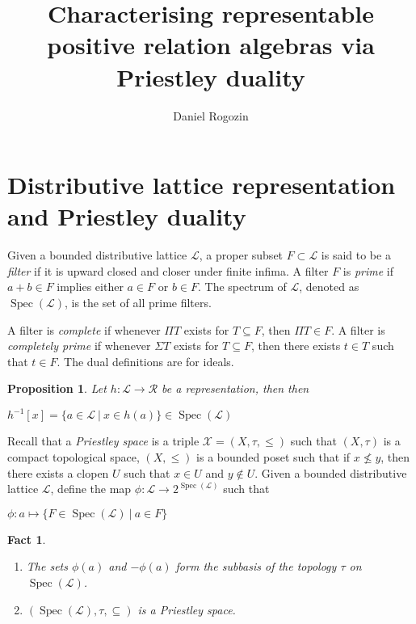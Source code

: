 \documentclass[a4paper]{article}
\author{Daniel Rogozin}
\date{}
\title{Characterising representable positive relation algebras via Priestley duality}
\theoremstyle{defin}
\theoremstyle{theorem}
\theoremstyle{claim}
\theoremstyle{prop}
\newtheorem{prop}{Proposition}
\theoremstyle{lemma}
\theoremstyle{fact}
\newtheorem{fact}{Fact}
\theoremstyle{ex}
\theoremstyle{col}
\begin{document}
\maketitle

\nocite{*}

\section{Distributive lattice representation and Priestley duality}

Given a bounded distributive lattice $\mathcal{L}$, a proper subset $F \subset \mathcal{L}$ is said to be a \emph{filter} if it is upward closed and closer under finite infima. A filter $F$ is \emph{prime} if $a + b \in F$ implies either $a \in F$ or $b \in F$. The spectrum of $\mathcal{L}$, denoted as $\operatorname{Spec}(\mathcal{L})$, is the set of all prime filters.

A filter is \emph{complete} if whenever $\Pi T$ exists for $T \subseteq F$, then $\Pi T \in F$. A filter is \emph{completely prime} if whenever $\Sigma T$ exists for $T \subseteq F$, then there exists $t \in T$ such that $t \in F$. The dual definitions are for ideals.

\begin{prop}
Let $h : \mathcal{L} \to \mathcal{R}$ be a representation, then then
\begin{center}
$h^{-1}[x] = \{ a \in \mathcal{L} \: | \: x \in h(a) \} \in \operatorname{Spec}(\mathcal{L})$
\end{center}
\end{prop}

Recall that a \emph{Priestley space} is a triple $\mathcal{X} = (X, \tau, \leq)$ such that $(X, \tau)$ is a compact topological space, $(X, \leq)$ is a bounded poset such that if $x \not\leq y$, then there exists a clopen $U$ such that $x \in U$ and $y \notin U$. Given a bounded distributive lattice $\mathcal{L}$, define the map $\phi : \mathcal{L} \to 2^{\operatorname{Spec}(\mathcal{L})}$ such that
\begin{center}
$\phi : a \mapsto \{ F \in \operatorname{Spec}(\mathcal{L}) \: | \: a \in F \}$
\end{center}

\begin{fact}

\begin{enumerate}
\item The sets $\phi(a)$ and $- \phi(a)$ form the subbasis of the topology $\tau$ on $\operatorname{Spec}(\mathcal{L})$.
\item $(\operatorname{Spec}(\mathcal{L}), \tau, \subseteq)$ is a Priestley space.
\end{enumerate}
\end{fact}
\end{document}
